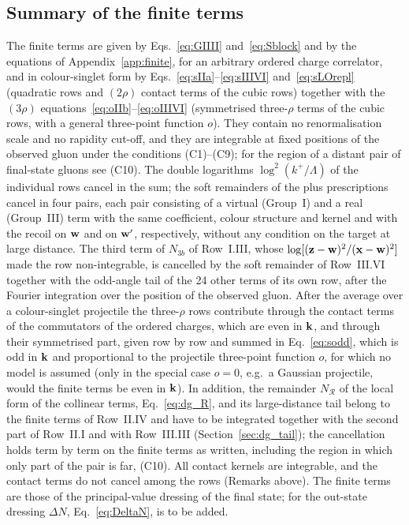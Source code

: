 \subsection{Summary of the finite terms}\label{sec:fin_summary}

The finite terms are given by Eqs.~\eqref{eq:GIIII} and~\eqref{eq:Sblock} and by the equations of Appendix~\ref{app:finite}, for an arbitrary ordered charge correlator, and in colour-singlet form by Eqs.~\eqref{eq:sIIa}--\eqref{eq:sIIIVI} and~\eqref{eq:sLOrepl} (quadratic rows and $(2\rho)$ contact terms of the cubic rows) together with the $(3\rho)$ equations~\eqref{eq:oIIb}--\eqref{eq:oIIIVI} (symmetrised three-$\rho$ terms of the cubic rows, with a general three-point function $o$). They contain no renormalisation scale and no rapidity cut-off, and they are integrable at fixed positions of the observed gluon under the conditions (C1)--(C9); for the region of a distant pair of final-state gluons see (C10). The double logarithms $\log^2(k^+/\Lambda)$ of the individual rows cancel in the sum; the soft remainders of the plus prescriptions cancel in four pairs, each pair consisting of a virtual (Group~I) and a real (Group~III) term with the same coefficient, colour structure and kernel and with the recoil on $\mathbf{w}$ and on $\mathbf{w}'$, respectively, without any condition on the target at large distance. The third term of $N_{3b}$ of Row~I.III, whose $\log[(\mathbf{z}-\mathbf{w})^2/(\mathbf{x}-\mathbf{w})^2]$ made the row non-integrable, is cancelled by the soft remainder of Row~III.VI together with the odd-angle tail of the 24 other terms of its own row, after the Fourier integration over the position of the observed gluon. After the average over a colour-singlet projectile the three-$\rho$ rows contribute through the contact terms of the commutators of the ordered charges, which are even in $\mathbf{k}$, and through their symmetrised part, given row by row and summed in Eq.~\eqref{eq:sodd}, which is odd in $\mathbf{k}$ and proportional to the projectile three-point function $o$, for which no model is assumed (only in the special case $o=0$, e.g.\ a Gaussian projectile, would the finite terms be even in $\mathbf{k}$). In addition, the remainder $N_{\mathcal R}$ of the local form of the collinear terms, Eq.~\eqref{eq:dg_R}, and its large-distance tail belong to the finite terms of Row~II.IV and have to be integrated together with the second part of Row~II.I and with Row~III.III (Section~\ref{sec:dg_tail}); the cancellation holds term by term on the finite terms as written, including the region in which only part of the pair is far, (C10). All contact kernels are integrable, and the contact terms do not cancel among the rows (Remarks above). The finite terms are those of the principal-value dressing of the final state; for the out-state dressing $\Delta N$, Eq.~\eqref{eq:DeltaN}, is to be added.
\par\endgroup
